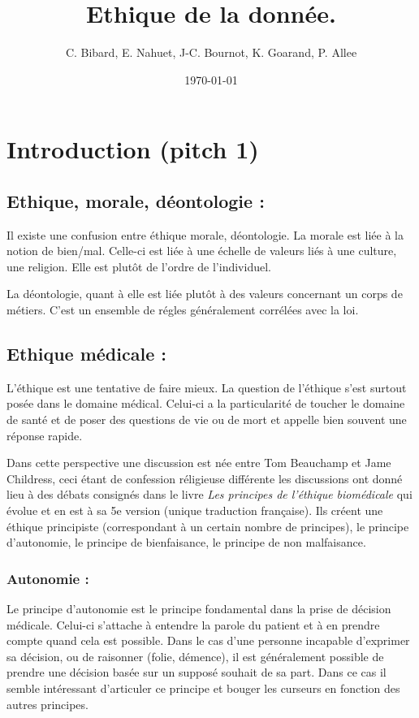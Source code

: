 \documentclass[a4paper,12pt]{article}
\title{Ethique de la donnée.}
\date{\today}
\author{C. Bibard, E. Nahuet, J-C. Bournot, K. Goarand, P. Allee}
\begin{document}
\maketitle


\section{Introduction (pitch 1)}



\subsection{Ethique, morale, déontologie : }

Il existe une confusion entre éthique morale, déontologie. La morale est liée à la notion de bien/mal. Celle-ci est liée à une échelle de valeurs liés à une culture, une religion. Elle est plutôt de l'ordre de l'individuel. 

La déontologie, quant à elle est liée plutôt à des valeurs concernant un corps de métiers. C'est un ensemble de régles généralement corrélées avec la loi. 

\subsection{Ethique médicale :}

L'éthique est une tentative de faire mieux. La question de l'éthique s'est surtout posée dans le domaine médical. Celui-ci a la particularité de toucher le domaine de santé et de poser des questions de vie ou de mort et appelle bien souvent une réponse rapide. 

Dans cette perspective une discussion est née entre Tom Beauchamp et Jame Childress, ceci étant de confession réligieuse différente les discussions ont donné lieu à des débats consignés dans le livre \textit{Les principes de l'éthique biomédicale} qui évolue et en est à sa 5e version (unique traduction française).
Ils créent une éthique principiste (correspondant à un certain nombre de principes), le principe d'autonomie, le principe de bienfaisance, le principe de non malfaisance.

\subsubsection{Autonomie : }

Le principe d'autonomie est le principe fondamental dans la prise de décision médicale. Celui-ci s'attache à entendre la parole du patient et à en prendre compte quand cela est possible. Dans le cas d'une personne incapable d'exprimer sa décision, ou de raisonner (folie, démence), il est généralement possible de prendre une décision basée sur un supposé souhait de sa part. Dans ce cas il semble intéressant d'articuler ce principe et bouger les curseurs en fonction des autres principes. 
\end{document}
